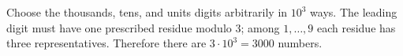 Choose the thousands, tens, and units digits arbitrarily in $10^3$ ways. The leading digit must have one prescribed residue modulo $3$; among $1,\ldots,9$ each residue has three representatives. Therefore there are $\boxed{3\cdot10^3=3000}$ numbers.
